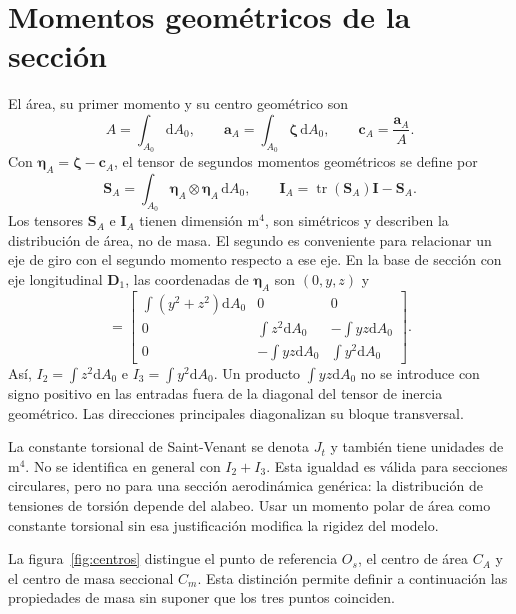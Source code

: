 \documentclass[11pt,a4paper,oneside]{report}
\newcommand{\vct}[1]{\bm{#1}}
\newcommand{\ten}[1]{\boldsymbol{#1}}
\newcommand{\dd}{\mathrm d}
\newcommand{\Id}{\mathbf I}
\begin{document}
\section{Momentos geométricos de la sección}
El área, su primer momento y su centro geométrico son
\begin{equation}
 A=\int_{A_0}\dd A_0,\qquad
 \vct a_A=\int_{A_0}\vct\zeta\,\dd A_0,\qquad
 \vct c_A=\frac{\vct a_A}{A}.
\end{equation}
Con $\vct\eta_A=\vct\zeta-\vct c_A$, el tensor de segundos momentos geométricos se define por
\begin{equation}
 \ten S_A=\int_{A_0}\vct\eta_A\otimes\vct\eta_A\,\dd A_0,
 \qquad
 \ten I_A=\operatorname{tr}(\ten S_A)\Id-\ten S_A.
 \label{eq:area_tensor}
\end{equation}
Los tensores $\ten S_A$ e $\ten I_A$ tienen dimensión $\mathrm{m^4}$, son simétricos y describen la distribución de área, no de masa. El segundo es conveniente para relacionar un eje de giro con el segundo momento respecto a ese eje. En la base de sección con eje longitudinal $\vct D_1$, las coordenadas de $\vct\eta_A$ son $(0,y,z)$ y
\begin{equation}
 [\ten I_A]=
 \begin{bmatrix}
 \int(y^2+z^2)\dd A_0&0&0\\
 0&\int z^2\dd A_0&-\int yz\dd A_0\\
 0&-\int yz\dd A_0&\int y^2\dd A_0
 \end{bmatrix}.
\end{equation}
Así, $I_2=\int z^2\dd A_0$ e $I_3=\int y^2\dd A_0$. Un producto $\int yz\dd A_0$ no se introduce con signo positivo en las entradas fuera de la diagonal del tensor de inercia geométrico. Las direcciones principales diagonalizan su bloque transversal.

La constante torsional de Saint-Venant se denota $J_t$ y también tiene unidades de $\mathrm{m^4}$. No se identifica en general con $I_2+I_3$. Esta igualdad es válida para secciones circulares, pero no para una sección aerodinámica genérica: la distribución de tensiones de torsión depende del alabeo. Usar un momento polar de área como constante torsional sin esa justificación modifica la rigidez del modelo.

La figura~\ref{fig:centros} distingue el punto de referencia $O_s$, el centro de área $C_A$ y el centro de masa seccional $C_m$. Esta distinción permite definir a continuación las propiedades de masa sin suponer que los tres puntos coinciden.
\end{document}
